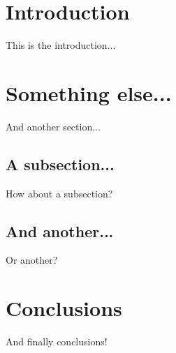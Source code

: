 \documentclass{acm_proc_article-sp}
\begin{document}
%
%
\section{Introduction}

This is the introduction...

\section{Something else...}

And another section...

\subsection{A subsection...}

How about a subsection?

\subsection{And another...}

Or another?


\section{Conclusions}

And finally conclusions!


%
%




%
%
\balancecolumns


%
%
\end{document}
